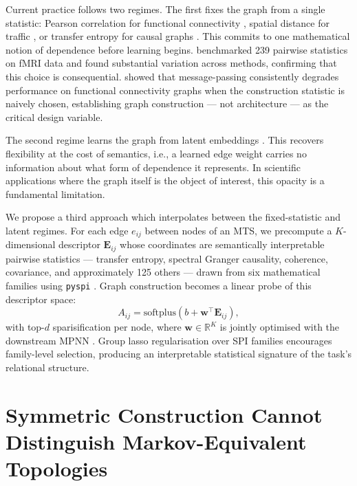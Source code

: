 \documentclass{article}
\theoremstyle{plain}
\begin{document}
Current practice follows two regimes. The first fixes the graph from a single statistic: Pearson correlation for functional connectivity \citep{bullmore2009}, spatial distance for traffic \citep{li2018dcrnn}, or transfer entropy for causal graphs \citep{duan2023}. This commits to one mathematical notion of dependence before learning begins. \citet{liu2025} benchmarked 239 pairwise statistics on fMRI data and found substantial variation across methods, confirming that this choice is consequential. \citet{qi2025} showed that message-passing consistently degrades performance on functional connectivity graphs when the construction statistic is naively chosen, establishing graph construction --- not architecture --- as the critical design variable.

The second regime learns the graph from latent embeddings \citep{kipf2018,wu2019,wu2020}. This recovers flexibility at the cost of semantics, i.e., a learned edge weight carries no information about what form of dependence it represents. In scientific applications where the graph itself is the object of interest, this opacity is a fundamental limitation.

We propose a third approach which interpolates between the fixed-statistic and latent regimes. For each edge $e_{ij}$ between nodes of an MTS, we precompute a $K$-dimensional descriptor $\mathbf{E}_{ij}$ whose coordinates are semantically interpretable pairwise statistics --- transfer entropy, spectral Granger causality, coherence, covariance, and approximately 125 others --- drawn from six mathematical families using \texttt{pyspi} \citep{cliff2023}. Graph construction becomes a linear probe of this descriptor space:
\begin{equation}
\label{eq:adj}
A_{ij} = \mathrm{softplus}\left(b + \mathbf{w}^\top \mathbf{E}_{ij}\right), 
\end{equation}
with top-$d$ sparisification per node, where $\mathbf{w} \in \mathbb{R}^K$ is jointly optimised with the downstream MPNN \citep[cf.][]{alain2017}. Group lasso regularisation \citep{yuan2006} over SPI families encourages family-level selection, producing an interpretable statistical signature of the task's relational structure.

\section{Symmetric Construction Cannot Distinguish Markov-Equivalent Topologies}
\label{sec:theory}
\end{document}
